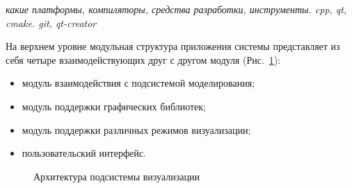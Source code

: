 \documentclass[a4paper,12pt]{extarticle}
\begin{document}
\textit{какие платформы, компиляторы, средства разработки, инструменты. cpp, qt, cmake. git, qt-creator}

На верхнем уровне модульная структура приложения системы представляет из себя четыре взаимодействующих друг с другом модуля (Рис.~\ref{ris:architecture-all}):
\begin{itemize}
    \item модуль взаимодействия с подсистемой моделирования;
    \item модуль поддержки графических библиотек;
    \item модуль поддержки различных режимов визуализации;
    \item пользовательский интерфейс.
\end{itemize}

\begin{figure}[h]
    \caption{Архитектура подсистемы визуализации}
    \label{ris:architecture-all}
\end{figure}
\end{document}
